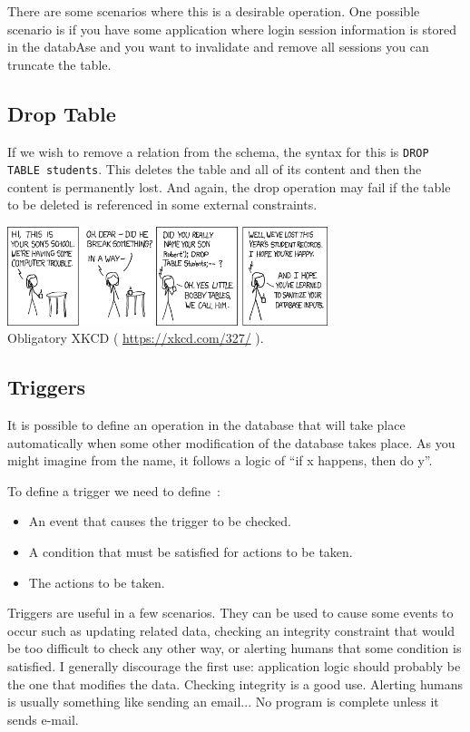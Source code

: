 There are some scenarios where this is a desirable operation. One possible scenario is if you have some application where login session information is stored in the databAse and you want to invalidate and remove all sessions you can truncate the table.

\subsection*{Drop Table}

If we wish to remove a relation from the schema, the syntax for this is \texttt{DROP TABLE students}. This deletes the table and all of its content and then the content is permanently lost. And again, the drop operation may fail if the table to be deleted is referenced in some external constraints.

\begin{center}
\includegraphics[width=0.7\textwidth]{images/exploits_of_a_mom}\\
Obligatory XKCD ( \url{https://xkcd.com/327/} ).
\end{center}

\subsection*{Triggers}

It is possible to define an operation in the database that will take place automatically when some other modification of the database takes place. As you might imagine from the name, it follows a logic of ``if x happens, then do y''. 

To define a trigger we need to define~\cite{dsc}:
\begin{itemize}
	\item An event that causes the trigger to be checked.
	\item A condition that must be satisfied for actions to be taken.
	\item The actions to be taken.
\end{itemize}

Triggers are useful in a few scenarios. They can be used to cause some events to occur such as updating related data, checking an integrity constraint that would be too difficult to check any other way, or alerting humans that some condition is satisfied. I generally discourage the first use: application logic should probably be the one that modifies the data. Checking integrity is a good use. Alerting humans is usually something like sending an email... No program is complete unless it sends e-mail.






